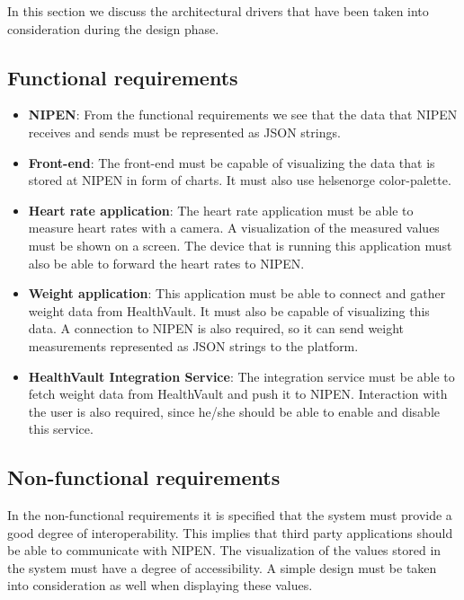 In this section we discuss the architectural drivers that have been taken into consideration
during the design phase.

\subsection{Functional requirements}

\begin{itemize}
\item\textbf{NIPEN}: 
From the functional requirements we see that the data that NIPEN receives and sends must be represented as JSON strings.

\item\textbf{Front-end}: 
The front-end must be capable of visualizing the data that is stored at NIPEN in form of charts. 
It must also use helsenorge color-palette.

\item\textbf{Heart rate application}: 
The heart rate application must be able to measure heart rates with a camera. 
A visualization of the measured values must be shown on a screen.
The device that is running this application must also be able to forward the heart rates to NIPEN.

\item\textbf{Weight application}: 
This application must be able to connect and gather weight data from HealthVault.
It must also be capable of visualizing this data.
A connection to NIPEN is also required, so it can send weight measurements represented as JSON strings to the platform.

\item\textbf{HealthVault Integration Service}:
The integration service must be able to fetch weight data from HealthVault and push it to NIPEN.
Interaction with the user is also required, since he/she should be able to enable and disable this service.
\end{itemize}

\subsection{Non-functional requirements}

In the non-functional requirements it is specified that the system must provide a good degree of interoperability.
This implies that third party applications should be able to communicate with NIPEN.
The visualization of the values stored in the system must have a degree of accessibility.
A simple design must be taken into consideration as well when displaying these values.

